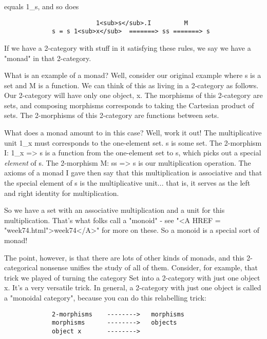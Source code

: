 equals 1_{s}, and so does

\begin{verbatim}
                         1<sub>s</sub>.I         M
             s = s 1<sub>x</sub>  =======> ss =======> s

\end{verbatim}
    
If we have a 2-category with stuff in it satisfying these rules, 
we say we have a "monad" in that 2-category.

What is an example of a monad?  Well, consider our original example
where s is a set and M is a function.  We can think of this as living in
a 2-category as follows.  Our 2-category will have only one object, x.
The morphisms of this 2-category are sets, and composing morphisms
corresponds to taking the Cartesian product of sets.  The 2-morphisms
of this 2-category are functions between sets.  

What does a monad amount to in this case?  Well, work it out!  The
multiplicative unit 1_{x} must corresponds to the one-element set.  s is
some set.  The 2-morphism I: 1_{x} => s is a function from the one-element
set to s, which picks out a special \emph{element} of s.  The 2-morphism 
M: ss => s is our multiplication operation.  The axioms of a monad I
gave then say that this multiplication is associative and that the
special element of s is the multiplicative unit... that is, it serves as
the left and right identity for multiplication.  

So we have a set with an associative multiplication and a unit for this
multiplication.  That's what folks call a "monoid" - see "<A HREF = "week74.html">week74</A>"
for more on these.  So a monoid is a special sort of monad!

The point, however, is that there are lots of other kinds of monads, and
this 2-categorical nonsense unifies the study of all of them.  Consider,
for example, that trick we played of turning the category Set into a
2-category with just one object x.  It's a very versatile trick.  In
general, a 2-category with just one object is called a "monoidal
category", because you can do this relabelling trick:

\begin{verbatim}
             2-morphisms    -------->   morphisms
             morphisms      -------->   objects
             object x       -------->   

\end{verbatim}
    

